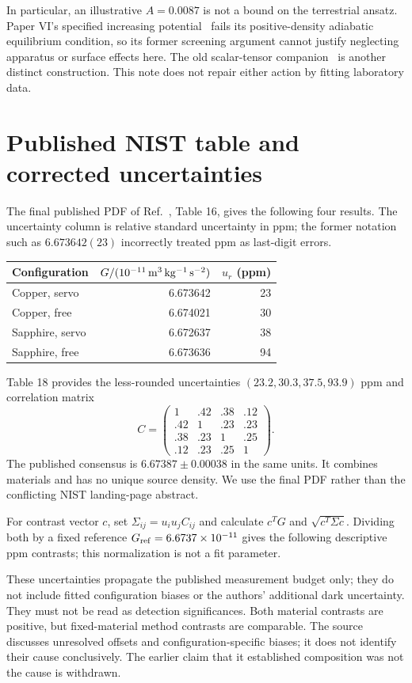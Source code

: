 \documentclass[11pt,a4paper]{article}
\begin{document}
In particular, an illustrative $A=0.0087$ is not a bound on the terrestrial
ansatz. Paper VI's specified increasing potential~\cite{Series_paper6} fails its positive-density
adiabatic equilibrium condition, so its former screening argument cannot
justify neglecting apparatus or surface effects here. The old scalar-tensor
companion~\cite{Series_companion} is another distinct construction. This note does not repair either
action by fitting laboratory data.

\section{Published NIST table and corrected uncertainties}
The final published PDF of Ref.~\cite{NIST}, Table 16, gives the following
four results. The uncertainty column is relative standard uncertainty in
ppm; the former notation such as $6.673642(23)$ incorrectly treated ppm
as last-digit errors.
\begin{center}
\begin{tabular}{lrr}
\toprule
Configuration & $G/(10^{-11}\,{\rm m^3\,kg^{-1}\,s^{-2}})$ & $u_r$ (ppm)\\
\midrule
Copper, servo & 6.673642 & 23\\
Copper, free & 6.674021 & 30\\
Sapphire, servo & 6.672637 & 38\\
Sapphire, free & 6.673636 & 94\\
\bottomrule
\end{tabular}
\end{center}
Table 18 provides the less-rounded uncertainties
$(23.2,30.3,37.5,93.9)$ ppm and correlation matrix
\begin{equation}
 C=\begin{pmatrix}
 1&.42&.38&.12\\ .42&1&.23&.23\\ .38&.23&1&.25\\ .12&.23&.25&1
 \end{pmatrix}.
\end{equation}
The published consensus is $6.67387\pm0.00038$ in the same units.
It combines materials and has no unique source density. We use the final
PDF rather than the conflicting NIST landing-page abstract.

For contrast vector $c$, set $\Sigma_{ij}=u_i u_jC_{ij}$ and calculate
$c^TG$ and $\sqrt{c^T\Sigma c}$. Dividing both by a fixed reference
$G_{\rm ref}=6.6737\times10^{-11}$ gives the following descriptive ppm
contrasts; this normalization is not a fit parameter.
\begin{center}

\end{center}
These uncertainties propagate the published measurement budget only; they
do not include fitted configuration biases or the authors' additional dark
uncertainty. They must not be read as detection significances. Both material
contrasts are positive, but fixed-material method contrasts are comparable.
The source discusses unresolved offsets and configuration-specific biases;
it does not identify their cause conclusively. The earlier claim that it
established composition was not the cause is withdrawn.
\end{document}
